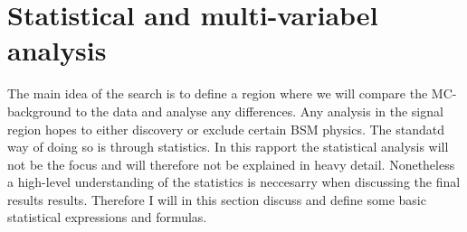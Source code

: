 \section{Statistical and multi-variabel analysis}
The main idea of the search is to define a region where we will compare
the \ac{MC}-background to the data and analyse any differences. Any analysis
in the signal region hopes to either discovery or exclude certain \ac{BSM}
physics. The standatd way of doing so is through statistics. In this rapport
the statistical analysis will not be the focus and will therefore not be
explained in heavy detail. Nonetheless a high-level understanding of the 
statistics is neccesarry when discussing the final results results. Therefore 
I will in this section discuss and define some basic statistical 
expressions and formulas.
